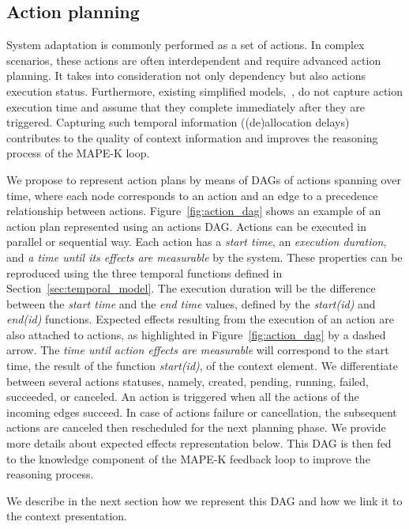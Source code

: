 \subsection{Action planning}
\label{sec:contribution-dag}

System adaptation is commonly performed as a set of actions. 
In complex scenarios, these actions are often interdependent and require advanced action planning.
It takes into consideration not only dependency but also actions execution status. 
Furthermore, existing simplified models,\eg~\cite{7194653,5984008}, do not capture action execution time and assume that they complete immediately after they are triggered. 
Capturing such temporal information (\eg (de)allocation delays) contributes to the quality of context information and improves the reasoning process of the MAPE-K loop.

We propose to represent action plans by means of DAGs of actions spanning over time,  where each node corresponds to an action and an edge to a precedence relationship between actions. 
Figure~\ref{fig:action_dag} shows an example of an action plan represented using an actions DAG.
Actions can be executed in parallel or sequential way.
Each action has a \textit{start time}, an \textit{execution duration}, and \textit{a time until its effects are measurable} by the system.
These properties can be reproduced using the three temporal functions defined in Section~\ref{sec:temporal_model}.
The execution duration will be the difference between the \textit{start time} and the \textit{end time} values, defined by the \textit{start(id)} and \textit{end(id)} functions.
Expected effects resulting from the execution of an action are also attached to actions, as highlighted in  Figure~\ref{fig:action_dag} by a dashed arrow. 
The \textit{ time until action effects are measurable} will correspond to the start time, \ie the result of the function \textit{start(id)}, of the context element.
We differentiate between several actions statuses, namely, created, pending, running, failed, succeeded, or canceled.
An action is triggered when all the actions of the incoming edges succeed. 
In case of actions failure or cancellation, the subsequent actions are canceled then rescheduled for the next planning phase. 
We provide more details about expected effects representation below.
This DAG is then fed to the knowledge component of the MAPE-K feedback loop to improve the reasoning process.

We describe in the next section how we represent this DAG and how we link it to the context presentation.


